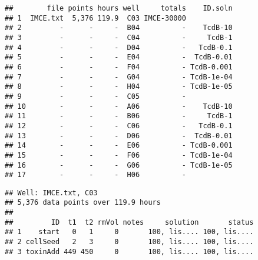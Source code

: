 \singlespacing
\begin{knitrout}
\color{fgcolor}\begin{kframe}
\begin{alltt}
 \hlkwb{=}   \hlstd{=} \hlstd{,}
                        \hlstd{=} \hlstd{,}  \hlstd{=} \hlstd{,}
                        \hlstd{=}  \hlstd{)}
\end{alltt}
\begin{verbatim}
##        file points hours well     totals    ID.soln
## 1  IMCE.txt  5,376 119.9  C03 IMCE-30000           
## 2         -      -     -  B04          -    TcdB-10
## 3         -      -     -  C04          -     TcdB-1
## 4         -      -     -  D04          -   TcdB-0.1
## 5         -      -     -  E04          -  TcdB-0.01
## 6         -      -     -  F04          - TcdB-0.001
## 7         -      -     -  G04          - TcdB-1e-04
## 8         -      -     -  H04          - TcdB-1e-05
## 9         -      -     -  C05          -           
## 10        -      -     -  A06          -    TcdB-10
## 11        -      -     -  B06          -     TcdB-1
## 12        -      -     -  C06          -   TcdB-0.1
## 13        -      -     -  D06          -  TcdB-0.01
## 14        -      -     -  E06          - TcdB-0.001
## 15        -      -     -  F06          - TcdB-1e-04
## 16        -      -     -  G06          - TcdB-1e-05
## 17        -      -     -  H06          -
\end{verbatim}
\begin{alltt}
\hlstd{(subset[[}\hlstd{]])}
\end{alltt}
\begin{verbatim}
## Well: IMCE.txt, C03
## 5,376 data points over 119.9 hours
## 
##         ID  t1  t2 rmVol notes     solution       status
## 1    start   0   1     0       100, lis.... 100, lis....
## 2 cellSeed   2   3     0       100, lis.... 100, lis....
## 3 toxinAdd 449 450     0       100, lis.... 100, lis....
\end{verbatim}
\begin{alltt}
 \hlkwb{=} \hlstd{subset[[}\hlstd{]]}\hlopt{$}\hlopt{$}

\end{alltt}
\end{kframe}
\end{knitrout}
